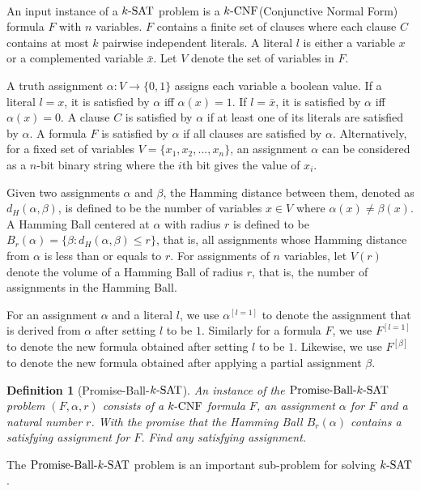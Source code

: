 \documentclass[a4paper,12pts]{article}
\newcommand{\SAT}{\textnormal{$k$-SAT}}
\newcommand{\CNF}{\textnormal{$k$-CNF}}
\newcommand{\dist}[2]{d_H(#1,#2)}
\newcommand{\ball}[2]{B_{#1}(#2)}
\newcommand{\PBS}{\textnormal{Promise-Ball-$\SAT$}}
\newtheorem{definition}{Definition}
\begin{document}
\paragraph{} An input instance of a $\SAT$ problem is a $\CNF$(Conjunctive Normal Form) formula $F$ with $n$ variables. $F$ contains a finite set of clauses where each clause $C$ contains at most $k$ pairwise independent literals. A literal $l$ is either a variable $x$ or a complemented variable $\bar{x}$. Let $V$ denote the set of variables in $F$. \par 
A truth assignment $\alpha: V\rightarrow \{0,1\}$ assigns each variable a boolean value. If a literal $l = x$, it is satisfied by $\alpha$ iff $\alpha(x) = 1$. If $l = \bar{x}$, it is satisfied by $\alpha$ iff $\alpha(x) = 0$. A clause $C$ is satisfied by $\alpha$ if at least one of its literals are satisfied by $\alpha$. A formula $F$ is satisfied by $\alpha$ if all clauses are satisfied by $\alpha$. Alternatively, for a fixed set of variables $V=\{x_1,x_2,...,x_n\}$, an assignment $\alpha$ can be considered as a $n$-bit binary string where the $i$th bit gives the value of $x_i$.\par 
Given two assignments $\alpha$ and $\beta$, the Hamming distance between them, denoted as $\dist{\alpha}{\beta}$, is defined to be the number of variables $x \in V$ where $\alpha(x) \neq \beta(x)$. A Hamming Ball centered at $\alpha$ with radius $r$ is defined to be $\ball{r}{\alpha} = \{\beta: \dist{\alpha}{\beta} \leq r\}$, that is, all assignments whose Hamming distance from $\alpha$ is less than or equals to $r$. For assignments of $n$ variables, let $V(r)$ denote the volume of a Hamming Ball of radius $r$, that is, the number of assignments in the Hamming Ball.\par 
For an assignment $\alpha$ and a literal $l$, we use $\alpha^{[l = 1]}$ to denote the assignment that is derived from $\alpha$ after setting $l$ to be $1$. Similarly for a formula $F$, we use $F^{[l = 1]}$ to denote the new formula obtained after setting $l$ to be $1$. Likewise, we use $F^{[\beta]}$ to denote the new formula obtained after applying a partial assignment $\beta$.\par 
\begin{definition}[\PBS\cite{Moser11}]
	An instance of the $\PBS$ problem $(F,\alpha,r)$ consists of a $\CNF$ formula $F$, an assignment $\alpha$ for $F$ and a natural number $r$. With the promise that the Hamming Ball $\ball{r}{\alpha}$ contains a satisfying assignment for $F$. Find any satisfying assignment.
\end{definition}
The $\PBS$ problem is an important sub-problem for solving $\SAT$. 
\end{document}
